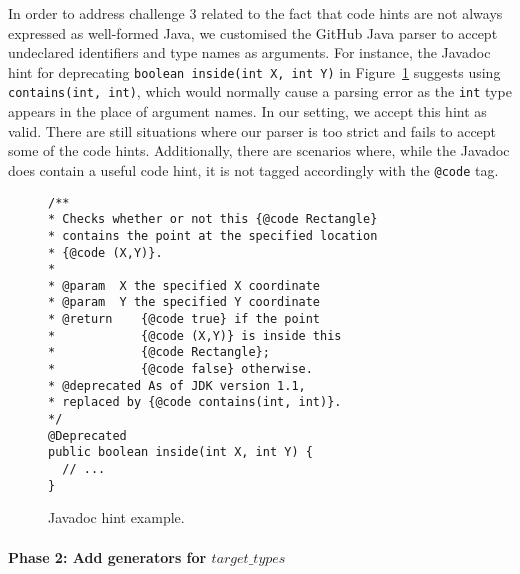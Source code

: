 \documentclass[sigconf,review,anonymous]{acmart}
\begin{document}
%
In order to address challenge 3 related to the fact that code hints are not always expressed as well-formed Java,
we customised the
GitHub Java parser
to accept undeclared identifiers and type names
as arguments. For instance, the Javadoc hint for deprecating \texttt{boolean inside(int X, int Y)}
in Figure~\ref{ex:javadoc-hint} suggests using
\texttt{contains(int, int)}, which would normally cause a parsing error as the \texttt{int} type
appears in the place of argument names. In our setting, we accept this hint as valid.
There are still situations where our parser is too strict and fails to accept
some of the code hints. Additionally, there are scenarios where, while the Javadoc
does contain a useful code hint, it is not tagged accordingly with
the \texttt{@code} tag. %

 
\begin{figure}
\begin{lstlisting}[mathescape=true,showstringspaces=false]
/**
* Checks whether or not this {@code Rectangle}
* contains the point at the specified location
* {@code (X,Y)}.
*
* @param  X the specified X coordinate
* @param  Y the specified Y coordinate
* @return    {@code true} if the point
*            {@code (X,Y)} is inside this
*            {@code Rectangle};
*            {@code false} otherwise.
* @deprecated As of JDK version 1.1,
* replaced by {@code contains(int, int)}.
*/
@Deprecated
public boolean inside(int X, int Y) {
  // ...
}
\end{lstlisting}
\caption{Javadoc hint example.}
\label{ex:javadoc-hint}
\end{figure}




\paragraph{{\bf Phase 2: Add generators for $target\_types$}}
\end{document}
